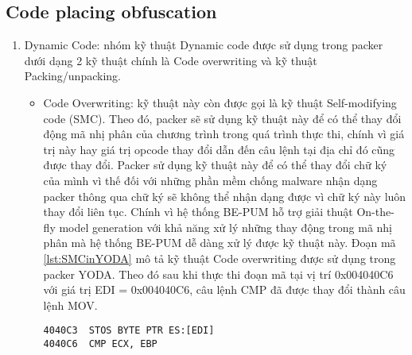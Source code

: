 \subsection{Code placing obfuscation}
\begin{enumerate}
\item{Dynamic Code: nhóm kỹ thuật Dynamic code được sử dụng trong packer dưới dạng 2 kỹ thuật chính là Code overwriting và kỹ thuật Packing/unpacking.  
\begin{itemize}
\item{Code Overwriting: kỹ thuật này còn được gọi là kỹ thuật Self-modifying code (SMC). Theo đó, packer sẽ sử dụng kỹ thuật này để có thể thay đổi động mã nhị phân của chương trình trong quá trình thực thi, chính vì giá trị này hay giá trị opcode thay đổi dẫn đến câu lệnh tại địa chỉ đó cũng được thay đổi. Packer sử dụng kỹ thuật này để có thể thay đổi chữ ký của mình vì thế đối với những phần mềm chống malware nhận dạng packer thông qua chữ ký sẽ không thể nhận dạng được vì chữ ký này luôn thay đổi liên tục. Chính vì hệ thống BE-PUM hỗ trợ giải thuật On-the-fly model generation với khả năng xử lý những thay động trong mã nhị phân mà hệ thống BE-PUM dễ dàng xử lý được kỹ thuật này. Đoạn mã \ref {lst:SMCinYODA} mô tả kỹ thuật Code overwriting được sử dụng trong packer YODA. Theo đó sau khi thực thi đoạn mã tại vị trí 0x004040C6 với giá trị EDI = 0x004040C6, câu lệnh CMP đã được thay đổi thành câu lệnh MOV. 
\begin{code}
\begin{lstlisting}[captionpos=b,caption={Kỹ thuật Code Overwriting sử dụng trong packer YODA},label={lst:SMCinYODA},frame=single]
4040C3	STOS BYTE PTR ES:[EDI]
4040C6	CMP ECX, EBP


\end{lstlisting}
\end{code}}
\end{itemize}}
\end{enumerate}
